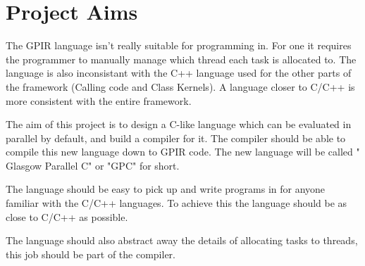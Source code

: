\section{Project Aims}

The GPIR language isn't really suitable for programming in. For one it requires the programmer to manually
manage which thread each task is allocated to. The language is also inconsistant with the C++ language used for 
the other parts of the framework (Calling code and Class Kernels). A language closer to C/C++ is more
consistent with the entire framework.

The aim of this project is to design a C-like language which can be evaluated in parallel by default, and build
a compiler for it. The compiler should be able to compile this new language down to GPIR code. The new language will
be called " Glasgow Parallel C" or "GPC" for short.

The language should be easy to pick up and write programs in for anyone familiar with the C/C++ languages.
To achieve this the language should be as close to C/C++ as possible. 

The language should also abstract away the details of allocating tasks to threads, this job
should be part of the compiler.

